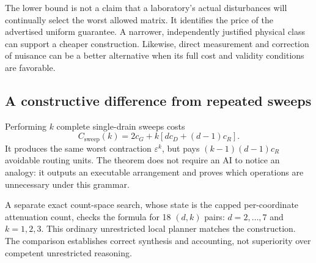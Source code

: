 \documentclass[11pt,letterpaper]{article}
\theoremstyle{definition}\newtheorem{definition}[theorem]{Definition}
\theoremstyle{remark}\newtheorem{remark}[theorem]{Remark}
\begin{document}
The lower bound is not a claim that a laboratory's actual disturbances will continually select the worst allowed matrix. It identifies the price of the advertised uniform guarantee. A narrower, independently justified physical class can support a cheaper construction. Likewise, direct measurement and correction of nuisance can be a better alternative when its full cost and validity conditions are favorable.

\subsection{A constructive difference from repeated sweeps}
Performing $k$ complete single-drain sweeps costs
\begin{equation}
 C_{\mathrm{sweep}}(k)=2c_G+k[d c_D+(d-1)c_R].
 \label{eq:sweep}
\end{equation}
It produces the same worst contraction $\varepsilon^k$, but pays $(k-1)(d-1)c_R$ avoidable routing units. The theorem does not require an AI to notice an analogy: it outputs an executable arrangement and proves which operations are unnecessary under this grammar.

A separate exact count-space search, whose state is the capped per-coordinate attenuation count, checks the formula for 18 $(d,k)$ pairs: $d=2,\ldots,7$ and $k=1,2,3$. This ordinary unrestricted local planner matches the construction. The comparison establishes correct synthesis and accounting, not superiority over competent unrestricted reasoning.
\end{document}

